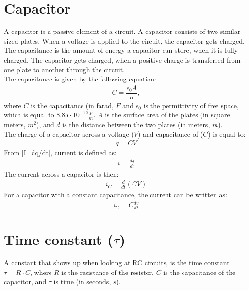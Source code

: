\section{Capacitor}
A capacitor is a passive element of a circuit. A capacitor consists of two similar sized plates. When a voltage is applied to the circuit, the capacitor gets charged. The capacitance is the amount of energy a capacitor can store, when it is fully charged. The capacitor gets charged, when a positive charge is transferred from one plate to another through the circuit.
\\
The capacitance is given by the following equation:
\begin{align*}
C=\dfrac{\epsilon_{0}A}{d},
\end{align*}
where $C$ is the capacitance (in farad, $F$ and $\epsilon_{0}$ is the permittivity of free space, which is equal to $8.85 \cdot 10^{-12}                                                 \frac{F}{m}$. $A$ is the surface area of the plates (in square meters, $m^{2}$), and $d$ is the distance between the two plates (in meters, $m$).
\\
The charge of a capacitor across a voltage ($V$) and capacitance of ($C$) is equal to:
\begin{align}
\label{QCV}
q = CV	
\end{align}
From \eqref{I=dq/dt}, current is defined as:
\begin{align*}
	i = \frac{dq}{dt}
\end{align*}
The current across a capacitor is then:
\begin{align*}
	i_C = \frac{d}{dt}(CV)
\end{align*}
For a capacitor with a constant capacitance, the current can be written as:
\begin{align}
	i_C = C\frac{dv}{dt}\label{iC}
\end{align}


\section{Time constant ($\tau$)}
A constant that shows up when looking at RC circuits, is the time constant $\tau = R \cdot C$, where $R$ is the resistance of the resistor, $C$ is the capacitance of the capacitor, and $\tau$ is time (in seconds, $s$).